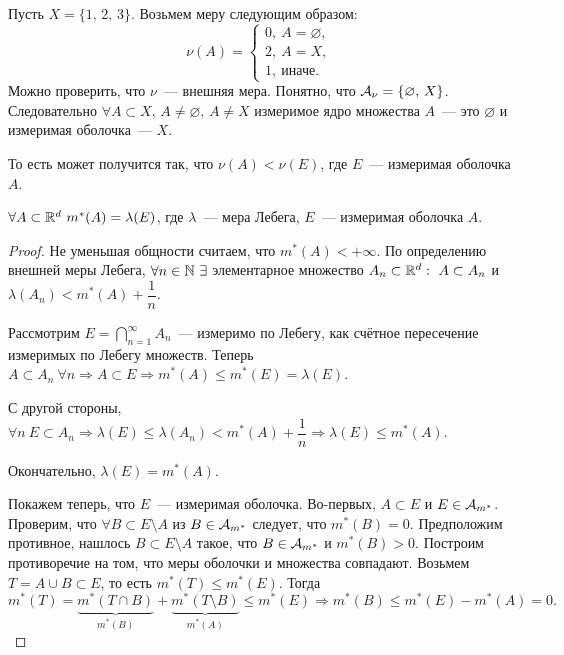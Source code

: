 \begin{exercise}
    Пусть $X=\{1,\, 2,\, 3\}$. Возьмем меру следующим образом:
    \[
        \nu(A)=\begin{cases}
            0,\ A=\varnothing, \\
            2,\ A=X,           \\
            1,\ \text{иначе.}
        \end{cases}
    \]
    Можно проверить, что $\nu$~--- внешняя мера. Понятно, что $\mathcal{A}_{\nu}=\{\varnothing,\, X\}$. Следовательно
    $\forall A\subset X,\, A\neq \varnothing,\, A\neq X$ измеримое ядро множества $A$~--- это $\varnothing$ и измеримая оболочка~--- $X$.

    \begin{remark}
        То есть может получится так, что $\nu(A)<\nu(E)$, где $E$~--- измеримая оболочка $A$.
    \end{remark}
\end{exercise}

\begin{claim}
    \label{lect8:cl:2}
    $\forall A\subset\mathbb{R}^d\ m^*(A)=\lambda(E)$, где $\lambda$~--- мера Лебега, $E$~--- измеримая оболочка $A$.

    \begin{proof}

        Не уменьшая общности считаем, что $m^*(A)<+\infty$.
        По определению внешней меры Лебега, $\forall n\in\mathbb{N}\ \exists$ элементарное множество $A_{n}\subset\mathbb{R}^d:\ A\subset A_{n}$ и
        $\lambda(A_{n})<m^*(A)+\dfrac{1}{n}$.

        Рассмотрим $E=\bigcap\limits_{n=1}^{\infty}A_n$~--- измеримо по Лебегу, как счётное пересечение измеримых по Лебегу множеств.
        Теперь $A\subset A_n\ \forall n\Rightarrow A\subset E\Rightarrow m^*(A)\leqslant m^*(E)=\lambda(E)$.

        С другой стороны, $\forall n\ E\subset A_n\Rightarrow \lambda(E)\leqslant \lambda(A_n)<m^*(A)+\dfrac{1}{n}\Rightarrow\lambda(E)\leqslant m^*(A)$.

        Окончательно, $\lambda(E)=m^*(A)$.

        Покажем теперь, что $E$~--- измеримая оболочка. Во-первых, $A\subset E$ и $E\in\mathcal{A}_{m^*}$. Проверим, что $\forall B\subset E\setminus A$ из
        $B\in\mathcal{A}_{m^*}$ следует, что $m^*(B)=0$. Предположим противное, нашлось $B\subset E\setminus A$ такое, что $B\in\mathcal{A}_{m^*}$ и $m^*(B)>0$.
        Построим противоречие на том, что меры оболочки и множества совпадают.
        Возьмем $T = A\cup B\subset E$, то есть $m^*(T)\leqslant m^*(E)$.
        Тогда \[
            m^*(T)=\underbrace{m^*(T\cap B)}_{m^*(B)}+\underbrace{m^*(T\setminus B)}_{m^*(A)}\leqslant m^*(E)\Rightarrow m^*(B)\leqslant m^*(E)-m^*(A)=0.
        \]

    \end{proof}
\end{claim}

